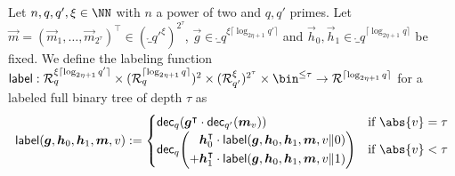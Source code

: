 \begin{definition}\label{def:label}
  Let $n,q,q',\xi\in\NN$ with $n$ a power of two and $q,q'$ primes.
  Let $\vec{m}=(\vec{m}_{1},\dots,\vec{m}_{{2^{\tau}}})^\intercal\in(\ring_{q'}^\xi)^{2^{\tau}}$, $\vec{g} \in \ring_{q}^{\xi\lceil\log_{2\eta+1} q'\rceil}$ and $\vec{h}_0,\vec{h}_1 \in \ring_q^{\lceil\log_{2\eta+1} q\rceil}$ be fixed.
  We define the labeling function $\lbl : \ring_{q}^{\xi\lceil\log_{2\eta+1} q'\rceil} \times (\ring_q^{\lceil\log_{2\eta+1} q\rceil})^2 \times (\ring^\xi_{q'})^{2^{\tau}}\times \bin^{\leq \tau} \to \ring^{\lceil \log_{2\eta+1} q \rceil}$ for a labeled full binary tree of depth $\tau$ as
  \[
    \lbl(\vec{g}, \vec{h}_0,\vec{h}_1,\vec{m},v) := \begin{cases} \decomp_{q}(\vec{g}^\intercal\cdot \decomp_{q'}(\vec{m}_{v})) & \text{if } \abs{v}=\tau\\ \decomp_q\mleft(\begin{aligned}\vec{h}_0^\intercal \cdot\lbl(\vec{g},\vec{h}_0,\vec{h}_1,\vec{m},v\Vert 0)\\ + \vec{h}_1^\intercal \cdot\lbl(\vec{g},\vec{h}_0,\vec{h}_1,\vec{m},v\Vert 1)\end{aligned}\mright)& \text{if } \abs{v}< \tau\end{cases}
  \]
\end{definition}

